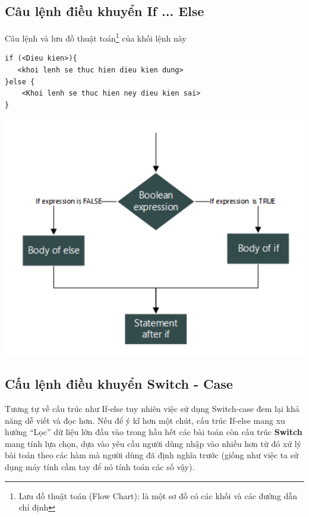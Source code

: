 \documentclass[12pt,a4paper]{article}
\begin{document}
\subsection{Câu lệnh điều khuyển If ... Else}
Câu lệnh và lưu đồ thuật toán\footnote{Lưu đồ thuật toán (Flow Chart): là một sơ đồ có các khối và các đường dẫn chỉ định} của khối lệnh này
\begin{lstlisting}
if (<Dieu kien>){
   <khoi lenh se thuc hien dieu kien dung>
}else {
	<Khoi lenh se thuc hien ney dieu kien sai>
}
\end{lstlisting}
\begin{center}
	\includegraphics[scale =0.45]{caulenhifelse}
\end{center}

\subsection{Cấu lệnh điều khuyển Switch - Case}
Tương tự về cấu trúc như If-else tuy nhiên việc sử dụng Switch-case đem lại khả năng dễ viết và đọc hơn. Nếu để ý kĩ hơn một chút, cấu trúc If-else mang xu hướng “Lọc” dữ liệu lớn đầu vào trong hầu hết các bài toán còn cấu trúc \textbf{Switch} mang tính lựa chọn, dựa vào yêu cầu người dùng nhập vào nhiều hơn từ đó xử lý bài toán theo các hàm mà người dùng đã định nghĩa trước (giống như việc ta sử dụng máy tính cầm tay để nó tính toán các số vậy).
\end{document}
